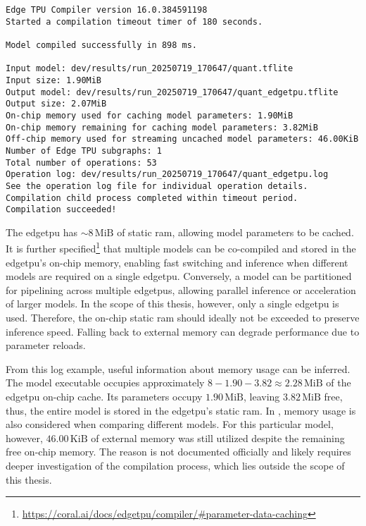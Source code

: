 {\begin{lstlisting}[style=compilerlog,
    caption={Edge TPU compiler console output. Successful compilation},
    label={lst:edgetpu_compilation}]
Edge TPU Compiler version 16.0.384591198
Started a compilation timeout timer of 180 seconds.

Model compiled successfully in 898 ms.

Input model: dev/results/run_20250719_170647/quant.tflite
Input size: 1.90MiB
Output model: dev/results/run_20250719_170647/quant_edgetpu.tflite
Output size: 2.07MiB
On-chip memory used for caching model parameters: 1.90MiB
On-chip memory remaining for caching model parameters: 3.82MiB
Off-chip memory used for streaming uncached model parameters: 46.00KiB
Number of Edge TPU subgraphs: 1
Total number of operations: 53
Operation log: dev/results/run_20250719_170647/quant_edgetpu.log
See the operation log file for individual operation details.
Compilation child process completed within timeout period.
Compilation succeeded!
\end{lstlisting}

The \gls{edgetpu} has \(\sim 8\,\mathrm{MiB}\) of static \gls{ram}, allowing model parameters to be cached.
It is further specified\footnote{\url{https://coral.ai/docs/edgetpu/compiler/\#parameter-data-caching}} that multiple models can be co-compiled and
stored in the \gls{edgetpu}'s on-chip memory, enabling fast switching and inference when different models are required on a single \gls{edgetpu}.
Conversely, a model can be partitioned for pipelining across multiple \glspl{edgetpu}, allowing parallel inference or acceleration of larger models.
In the scope of this thesis, however, only a single \gls{edgetpu} is used.
Therefore, the on-chip static \gls{ram} should ideally not be exceeded to preserve inference speed.
Falling back to external memory can degrade performance due to parameter reloads.

From this log example, useful information about memory usage can be inferred.
The model executable occupies approximately \(8 - 1.90 - 3.82 \approx 2.28\,\mathrm{MiB}\) of the \gls{edgetpu} on-chip cache.
Its parameters occupy \(1.90\,\mathrm{MiB}\), leaving \(3.82\,\mathrm{MiB}\) free, thus, the entire model is stored in the \gls{edgetpu}'s static \gls{ram}.
In , memory usage is also considered when comparing different models.
For this particular model, however, \(46.00\,\mathrm{KiB}\) of external memory was still utilized despite the remaining free on-chip memory.
The reason is not documented officially and likely requires deeper investigation of the compilation process, which lies outside the scope of this thesis.

}
